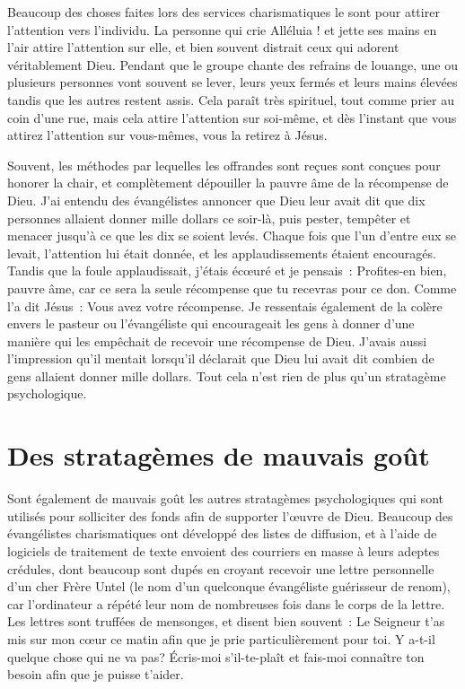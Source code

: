 Beaucoup des choses faites lors des services charismatiques
 le sont pour attirer l'attention vers l'individu.
 La personne qui crie \og Alléluia ! \fg{} et jette ses mains en l'air
 attire l'attention sur elle, et bien souvent distrait ceux qui adorent
 véritablement Dieu. Pendant que le groupe chante des refrains de louange,
 une ou plusieurs personnes vont souvent se lever, leurs yeux fermés
 et leurs mains élevées tandis que les autres restent assis.
 Cela paraît très spirituel, tout comme prier au coin d'une rue,
 mais cela attire l'attention sur soi-même, et dès l'instant
 que vous attirez l'attention sur vous-mêmes, vous la retirez à Jésus.

Souvent, les méthodes par lequelles les offrandes sont reçues
 sont conçues pour honorer la chair, et complètement dépouiller
 la pauvre âme de la récompense de Dieu. J'ai entendu des évangélistes
 annoncer que Dieu leur avait dit que dix personnes allaient donner
 mille dollars ce soir-là, puis pester, tempêter et menacer jusqu'à
 ce que les dix se soient levés. Chaque fois que l'un d'entre eux
 se levait, l'attention lui était donnée, et les applaudissements
 étaient encouragés. Tandis que la foule applaudissait,
 j'étais écœuré et je pensais~: \og Profites-en bien, pauvre âme,
 car ce sera la seule récompense que tu recevras pour ce don. \fg{}
 Comme l'a dit Jésus~: \og Vous avez votre récompense. \fg{}
 Je ressentais également de la colère envers le pasteur
 ou l'évangéliste qui encourageait les gens à donner d'une manière
 qui les empêchait de recevoir une récompense de Dieu.
 J'avais aussi l'impression qu'il mentait lorsqu'il déclarait
 que Dieu lui avait dit combien de gens allaient donner mille dollars.
 Tout cela n'est rien de plus qu'un stratagème psychologique.


\section{Des stratag\`emes de mauvais go\^ut}

Sont également de mauvais goût les autres stratagèmes psychologiques
 qui sont utilisés pour solliciter des fonds afin de supporter l'œuvre
 de Dieu. Beaucoup des évangélistes charismatiques ont développé
 des listes de diffusion, et à l'aide de logiciels de traitement
 de texte envoient des courriers en masse à leurs adeptes crédules,
 dont beaucoup sont dupés en croyant recevoir une lettre personnelle
 d'un cher Frère Untel (le nom d'un quelconque évangéliste guérisseur
 de renom), car l'ordinateur a répété leur nom de nombreuses fois
 dans le corps de la lettre. Les lettres sont truffées de mensonges,
 et disent bien souvent~: \og Le Seigneur t'as mis sur mon cœur
 ce matin afin que je prie particulièrement pour toi.
 Y a-t-il quelque chose qui ne va pas? Écris-moi s'il-te-plaît
 et fais-moi connaître ton besoin afin que je puisse t'aider. \fg{}

